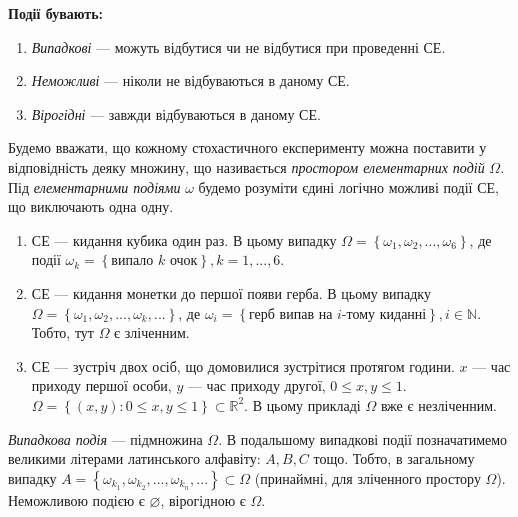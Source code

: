 \noindent \textbf{Події бувають:}
\begin{enumerate}
    \item \emph{Випадкові} --- можуть відбутися чи не відбутися при проведенні СЕ.
    \item \emph{Неможливі} --- ніколи не відбуваються в даному СЕ.
    \item \emph{Вірогідні} --- завжди відбуваються в даному СЕ.
\end{enumerate}
\begin{definition}
    Будемо вважати, що кожному стохастичного експерименту можна поставити у відповідність деяку множину, що
    називається \emph{простором елементарних подій} $\Omega$. 
    Під \emph{елементарними подіями} $\omega$ будемо розуміти єдині
    логічно можливі події СЕ, що виключають одна одну.
\end{definition}
\begin{example}
    \begin{enumerate}
        \item СЕ --- кидання кубика один раз. В цьому випадку
        $\Omega = \left\{\omega_1, \omega_2, ..., \omega_6\right\}$, 
        де події 
        $\omega_k = \left\{\text{випало } k \text{ очок}\right\}, k = 1,...,6$.
        \item СЕ --- кидання монетки до першої появи герба. В цьому випадку
        $\Omega = \left\{\omega_1, \omega_2, ..., \omega_k, ...\right\}$,  
        де $\omega_i = \left\{\text{герб випав на }i\text{-тому киданні}\right\}, i\in \mathbb{N}$.
        Тобто, тут $\Omega$ є зліченним.
        \item СЕ --- зустріч двох осіб, що домовилися зустрітися протягом години.
        $x$ --- час приходу першої особи, $y$ --- час приходу другої, $0\leq x, y \leq 1$.
        $\Omega = \left\{ \left( x, y\right): 0\leq x, y \leq 1\right\}\subset \mathbb{R}^2$.
        В цьому прикладі $\Omega$ вже є незліченним.
    \end{enumerate}
\end{example}
\begin{definition}
    \emph{Випадкова подія} --- підмножина $\Omega$. В подальшому випадкові події позначатимемо великими літерами латинського алфавіту: $A, B, C$ тощо.
    Тобто, в загальному випадку $A = \left\{\omega_{k_1}, \omega_{k_2}, ..., \omega_{k_n}, ...\right\} \subset \Omega$
    (принаймні, для зліченного простору $\Omega$).
    Неможливою подією є $\varnothing$, вірогідною є $\Omega$. 
\end{definition}

